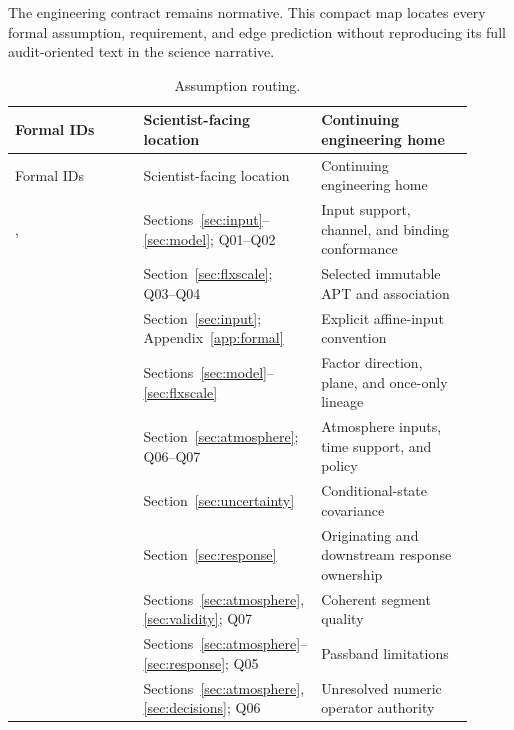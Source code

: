 \small
The engineering contract remains normative. This compact map locates every
formal assumption, requirement, and edge prediction without reproducing its
full audit-oriented text in the science narrative.

\begin{longtable}{L{0.30\linewidth}L{0.26\linewidth}L{0.35\linewidth}}
\caption{Assumption routing.}\\
\toprule Formal IDs & Scientist-facing location & Continuing engineering home \\
\midrule\endfirsthead\toprule Formal IDs & Scientist-facing location & Continuing engineering home \\
\midrule\endhead
{},  & Sections~\ref{sec:input}--\ref{sec:model}; Q01--Q02 & Input support, channel, and binding conformance \\
 & Section~\ref{sec:flxscale}; Q03--Q04 & Selected immutable APT and association \\
 & Section~\ref{sec:input}; Appendix~\ref{app:formal} & Explicit affine-input convention \\
 & Sections~\ref{sec:model}--\ref{sec:flxscale} & Factor direction, plane, and once-only lineage \\
 & Section~\ref{sec:atmosphere}; Q06--Q07 & Atmosphere inputs, time support, and policy \\
 & Section~\ref{sec:uncertainty} & Conditional-state covariance \\
 & Section~\ref{sec:response} & Originating and downstream response ownership \\
 & Sections~\ref{sec:atmosphere}, \ref{sec:validity}; Q07 & Coherent segment quality \\
 & Sections~\ref{sec:atmosphere}--\ref{sec:response}; Q05 & Passband limitations \\
 & Sections~\ref{sec:atmosphere}, \ref{sec:decisions}; Q06 & Unresolved numeric operator authority \\
\bottomrule
\end{longtable}

